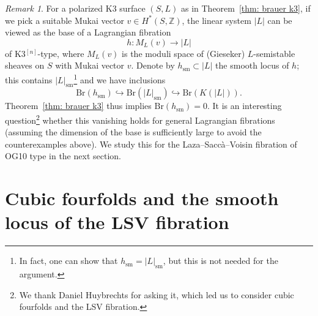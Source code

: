 \documentclass[11pt]{amsart}
\theoremstyle{plain}
\theoremstyle{definition}
\theoremstyle{remark}
\newtheorem{rmk}[thm]{Remark}
\begin{document}
\begin{rmk}\label{rmk: lagrangian smooth locus}
    For a polarized K3 surface $(S,L)$ as in Theorem~\ref{thm: brauer k3}, if we pick a suitable Mukai vector ${v}\in H^*(S, \mathbb Z)$, the linear system $|L|$ can be viewed as the base of a Lagrangian fibration
\[
h: M_L({v}) \to |L|
\]
of K3$^{[n]}$-type, where $M_L(v)$ is the moduli space of (Gieseker) $L$-semistable sheaves on $S$ with Mukai vector $v$. Denote by $h_\mathrm{sm}\subset |L|$ the smooth locus of $h$; this contains $|L|_\mathrm{sm}$\footnote{In fact, one can show that $h_{\mathrm{sm}} = |L|_{\mathrm{sm}}$, but this is not needed for the argument.} and we have inclusions
\[
\mathrm{Br}(h_\mathrm{sm}) \hookrightarrow \mathrm{Br}(|L|_\mathrm{sm}) \hookrightarrow \mathrm{Br}(K(|L|)).
\]
Theorem~\ref{thm: brauer k3} thus implies $\mathrm{Br}(h_\mathrm{sm}) = 0$. It is an interesting question\footnote{{We thank Daniel Huybrechts for asking it, which led us to consider cubic fourfolds and the LSV fibration.}} whether this vanishing holds for general Lagrangian fibrations (assuming the dimension of the base is sufficiently large to avoid the counterexamples above). We study this for the Laza--Saccà--Voisin fibration of OG10 type \cite{LSV} in the next section.
\end{rmk}

\section{Cubic fourfolds and the smooth locus of the LSV fibration} \label{sec: cubic fourfold}
\end{document}
